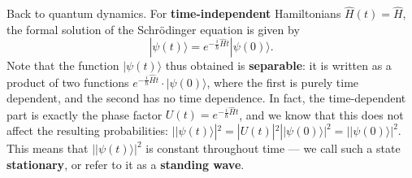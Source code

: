 \documentclass[fleqn,a4paper]{article}
\theoremstyle{definition}
\theoremstyle{definition}
\theoremstyle{definition}
\theoremstyle{definition}
\theoremstyle{remark}
\begin{document}
Back to quantum dynamics.
For \textbf{time-independent} Hamiltonians \(\hat{H}(t)=\hat{H}\), the formal solution of the Schrödinger equation is given by
\[
  |\psi(t)\rangle
  = e^{-\frac{i}{\hbar}\hat{H}t}|\psi(0)\rangle.
\]
Note that the function \(|\psi(t)\rangle\) thus obtained is \textbf{separable}: it is written as a product of two functions \(e^{-\frac{i}{\hbar}\hat{H}t}\cdot|\psi(0)\rangle\), where the first is purely time dependent, and the second has no time dependence.
In fact, the time-dependent part is exactly the phase factor \(U(t)=e^{-\frac{i}{\hbar}\hat{H}t}\), and we know that this does not affect the resulting probabilities: \(||\psi(t)\rangle|^2=|U(t)|^2||\psi(0)\rangle|^2=||\psi(0)\rangle|^2\).
This means that \(||\psi(t)\rangle|^2\) is constant throughout time --- we call such a state \textbf{stationary}, or refer to it as a \textbf{standing wave}.
\end{document}
